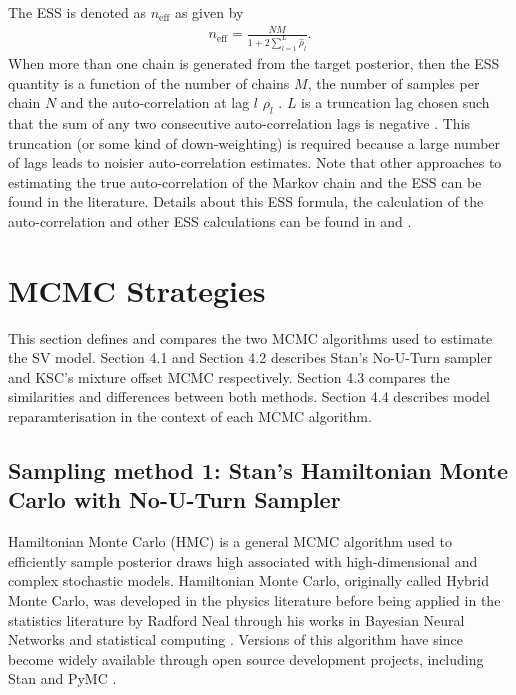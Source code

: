 \documentclass[12pt, a4paper]{article}
\begin{document}
            The ESS is denoted as $n_{\text{eff}}$ as given by
            \begin{align}
                n_{\text{eff}} = \frac{NM}{1+2 \sum_{l=1}^L \hat{\rho}_l}.
            \end{align}
            When more than one chain is generated from the target posterior, then the ESS quantity is a function of the number of chains $M$, the number of samples per chain $N$ and the auto-correlation at lag $l$ $\rho_l$ \citep{vehtari2021rank}. $L$ is a truncation lag chosen such that the sum of any two consecutive auto-correlation lags is negative \citep{geyer1992practical}. This truncation (or some kind of down-weighting) is required because a large number of lags leads to noisier auto-correlation estimates. Note that other approaches to estimating the true auto-correlation of the Markov chain and the ESS can be found in the literature. Details about this ESS formula, the calculation of the auto-correlation and other ESS calculations can be found in \citet{vehtari2021rank} and \citet{geyer1992practical}.

\section{MCMC Strategies}
This section defines and compares the two MCMC algorithms used to estimate the SV model. Section 4.1 and Section 4.2 describes Stan's No-U-Turn sampler and KSC's mixture offset MCMC respectively. Section 4.3 compares the similarities and differences between both methods. Section 4.4 describes model reparamterisation in the context of each MCMC algorithm. 
    \subsection{Sampling method 1: Stan's Hamiltonian Monte Carlo with No-U-Turn Sampler}
        Hamiltonian Monte Carlo (HMC) is a  general MCMC algorithm used to efficiently sample posterior draws  high associated with high-dimensional and complex stochastic models. Hamiltonian Monte Carlo, originally called Hybrid Monte Carlo, was developed in the physics literature \citep{duane1987hybrid} before being applied in the statistics literature by Radford Neal through his works in Bayesian Neural Networks \citep{neal1995bayesian} and statistical computing \citep{neal2011mcmc}. Versions of this algorithm have since become widely available through open source development projects, including Stan \citep{stan} and PyMC \citep{pymc2023}.
\end{document}
